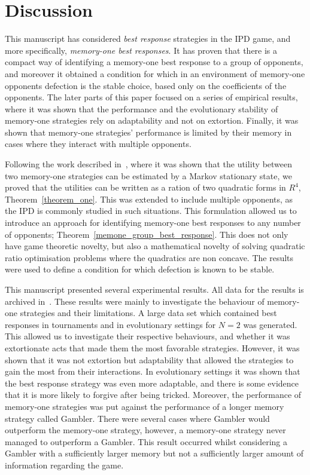 \documentclass[10pt]{article}
\begin{document}
\section{Discussion}
This manuscript has considered \textit{best response} strategies in the IPD game, and
more specifically, \textit{memory-one best responses}. It has proven that there is
a compact way of identifying a memory-one best response to a group of opponents,
and moreover it obtained a condition for which in an
environment of memory-one opponents defection is the stable choice, based only
on the coefficients of the opponents.
The later parts of this paper focused on a series of empirical results, where it
was shown that the performance and the evolutionary stability of memory-one
strategies rely on adaptability and not on extortion. Finally, it was shown that
memory-one strategies' performance is limited by their memory in cases where
they interact with multiple opponents.

Following the work described in~\cite{Nowak1989}, where it was shown that the
utility between two memory-one strategies can be estimated by a Markov
stationary state, we proved that the utilities can be written as a ration of two
quadratic forms in $R^4$, Theorem~\ref{theorem_one}. This was extended to
include multiple opponents, as the IPD is commonly studied in such situations.
This formulation allowed us to introduce an approach for identifying memory-one
best responses to any number of opponents;
Theorem~\ref{memone_group_best_response}. This does not only have game theoretic
novelty, but also a mathematical novelty of solving quadratic ratio optimisation
problems where the quadratics are non concave. The results were used to
define a condition for which defection is known to be stable.

This manuscript presented several experimental results. All data for the results
is archived in~\cite{glynatsi2019}. These results were mainly to investigate the
behaviour of memory-one strategies and their limitations. A large data set which
contained best responses in tournaments and in evolutionary settings for $N=2$
was generated. This allowed us to investigate their respective behaviours, and
whether it was extortionate acts that made them the most favorable strategies.
However, it was shown that it was not extortion but adaptability that allowed
the strategies to gain the most from their interactions. In evolutionary settings
it was shown that the best response strategy was even more adaptable, and there
is some evidence that it is more likely to forgive after being tricked.
Moreover, the performance of
memory-one strategies was put against the performance of a longer memory
strategy called Gambler. There were several cases where Gambler would outperform
the memory-one strategy, however, a memory-one strategy never managed to
outperform a Gambler. This result occurred whilst considering a Gambler with a
sufficiently larger memory but not a sufficiently larger amount of information
regarding the game.
\end{document}
